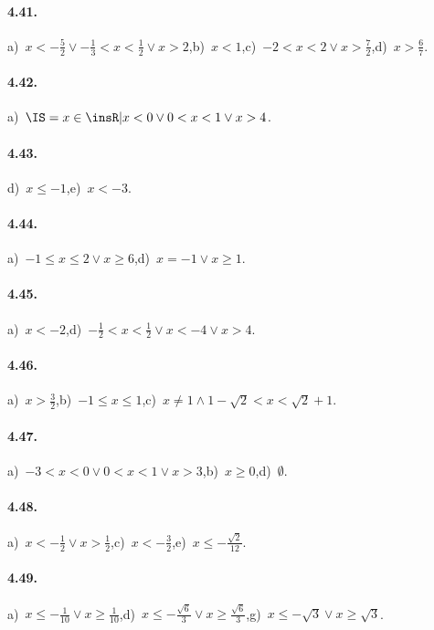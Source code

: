 \paragraph{4.41.} a)~$x<-\frac 5 2\vee -\frac 1 3<x<\frac 1 2\vee x>2$,\quad b)~$x<1$,\quad c)~$-2<x<2\vee x>\frac 7 2$,\quad d)~$x>\frac{6}{7}$.

\paragraph{4.42.} a)~$\IS=x\in \insR| x<0\vee 0<x<1\vee x>4$.

\paragraph{4.43.} d)~$x\le -1$,\quad e)~$x<-3$.

\paragraph{4.44.} a)~$-1\le x\le 2\vee x\ge 6$,\quad d)~$x=-1\vee x\ge 1$.

\paragraph{4.45.} a)~$x<-2$,\quad d)~$-\frac{1}{2}<x<\frac{1}{2}\vee x<-4\vee x>4$.

\paragraph{4.46.} a)~$x>\frac 3 2$,\quad b)~$-1\le x\le 1$,\quad c)~$x\neq 1 \wedge 1-\sqrt{2}<x<\sqrt{2}+1$.

\paragraph{4.47.} a)~$-3<x<0\vee 0<x<1\vee x>3$,\quad b)~$x\ge 0$,\quad d)~$\emptyset$.

\paragraph{4.48.} a)~$x<-\frac{1}{2}\vee x>\frac{1}{2}$,\quad c)~$x<-\frac{3}{2}$,\quad e)~$x\le -\frac{\sqrt{2}}{12}$.

\paragraph{4.49.} a)~$x\le -\frac{1}{10}\vee x\ge \frac{1}{10}$,\quad d)~$x\le -\frac{\sqrt{6}}{3}\vee x\ge \frac{\sqrt{6}}{3}$,\quad g)~$x\le-\sqrt{3}\vee x\ge \sqrt{3}$.

